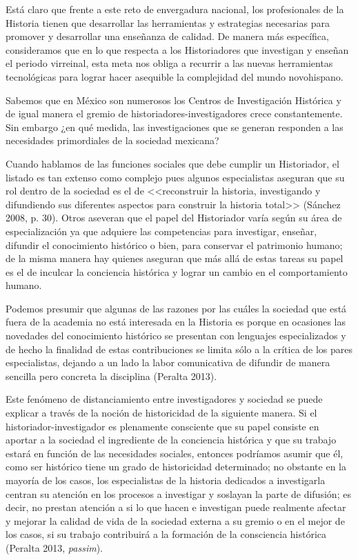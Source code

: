 Está claro que frente a este reto de envergadura nacional, los profesionales de
la Historia tienen que desarrollar las herramientas y estrategias necesarias
para promover y desarrollar una enseñanza de calidad. De manera más específica,
consideramos que en lo que respecta a los Historiadores que investigan y
enseñan el periodo virreinal, esta meta nos obliga a recurrir a las nuevas
herramientas tecnológicas para lograr hacer asequible la complejidad del mundo
novohispano.


Sabemos que en México son numerosos los Centros de Investigación Histórica y de
igual manera el gremio de historiadores-investigadores crece constantemente.
Sin embargo ¿en qué medida, las investigaciones que se generan responden a las
necesidades primordiales de la sociedad mexicana? 


Cuando hablamos de las funciones sociales que debe cumplir un Historiador, el
listado es tan extenso como complejo pues algunos especialistas aseguran que su
rol dentro de la sociedad es el de <<reconstruir la historia, investigando y
difundiendo sus diferentes aspectos para construir  la historia total>>
(Sánchez 2008, p. 30). Otros  aseveran que el papel del Historiador varía según
su área de especialización ya que adquiere las competencias para investigar,
enseñar, difundir el conocimiento histórico o bien, para conservar el
patrimonio humano; de la misma manera hay quienes aseguran que más allá de
estas tareas su papel es el de inculcar la conciencia histórica y lograr un
cambio en el comportamiento humano.


Podemos presumir que algunas de las razones por las cuáles la sociedad que está
fuera de la academia no está interesada en la Historia es porque en ocasiones
las novedades del conocimiento histórico se presentan con lenguajes
especializados y de hecho la finalidad de estas contribuciones se limita sólo a
la crítica de los pares especialistas, dejando a un lado la labor comunicativa
de difundir de manera sencilla pero concreta la disciplina (Peralta 2013).

 
Este fenómeno de distanciamiento entre investigadores y sociedad se puede
explicar a través de la noción de historicidad de la siguiente manera. Si el
historiador-investigador es plenamente consciente que su papel consiste en
aportar a la sociedad el ingrediente de la conciencia histórica y que su
trabajo estará en función de las necesidades sociales, entonces podríamos
asumir que él, como ser histórico tiene un grado de historicidad determinado;
no obstante en la mayoría de los casos, los especialistas de la historia
dedicados a investigarla centran su atención en los procesos a investigar y
soslayan la parte de difusión; es decir, no prestan atención a si lo que hacen
e investigan puede realmente afectar y mejorar la calidad de vida de la
sociedad externa a su gremio o en el mejor de los casos, si su trabajo
contribuirá a la formación de la consciencia histórica (Peralta 2013,
\textit{passim}).


